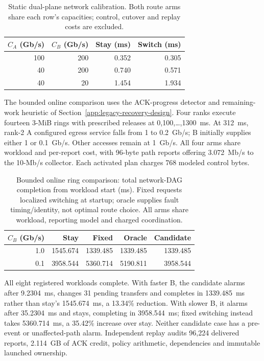 \documentclass[sigconf]{acmart}
\begin{document}
\begin{table}[t]
  \caption{Static dual-plane network calibration. Both route arms share
  each row's capacities; control, cutover and replay costs are excluded.}
  \label{tab:dual-calibration}
  \centering
  \small
  \begin{tabular}{@{}rrrr@{}}
    \toprule
    $C_A$ (Gb/s) & $C_B$ (Gb/s) & Stay (ms) & Switch (ms) \\
    \midrule
    100 & 200 & 0.352 & 0.305 \\
    40 & 200 & 0.740 & 0.571 \\
    40 & 20 & 1.454 & 1.934 \\
    \bottomrule
  \end{tabular}
\end{table}

The bounded online comparison uses the ACK-progress detector and
remaining-work heuristic of Section~\ref{app:legacy-recovery-design}. Four ranks
execute fourteen 3-MiB rings with prescribed releases at
0,100,\ldots,1300~ms. At 312~ms, rank-2 A configured egress service falls
from 1 to 0.2~Gb/s; B initially supplies either 1 or 0.1~Gb/s. Other
accesses remain at 1~Gb/s. All four arms share workload and per-report
cost, with 96-byte path reports offering 3.072~Mb/s to the 10-Mb/s
collector. Each activated plan charges 768 modeled control bytes.

\begin{table}[t]
\caption{Bounded online ring comparison: total network-DAG completion
from workload start (ms). Fixed requests localized switching at startup;
oracle supplies fault timing/identity, not optimal route choice. All arms
share workload, reporting model and charged coordination.}
\label{tab:online-route}
\centering\small
\begin{tabular}{@{}rrrrr@{}}
\toprule
$C_B$ (Gb/s) & Stay & Fixed & Oracle & Candidate\\
\midrule
1.0 & 1545.674 & 1339.485 & 1339.485 & 1339.485\\
0.1 & 3958.544 & 5360.714 & 5190.811 & 3958.544\\
\bottomrule
\end{tabular}
\end{table}

All eight registered workloads complete. With faster B, the candidate
alarms after 9.2304~ms, changes 31 pending transfers and completes in
1339.485~ms rather than stay's 1545.674~ms, a 13.34\% reduction. With
slower B, it alarms after 35.2304~ms and stays, completing in 3958.544~ms;
fixed switching instead takes 5360.714~ms, a 35.42\% increase over stay.
Neither candidate case has a pre-event or unaffected-path alarm.
Independent replay audits 96,224 delivered reports, 2.114~GB of ACK
credit, policy arithmetic, dependencies and immutable launched ownership.
\end{document}
